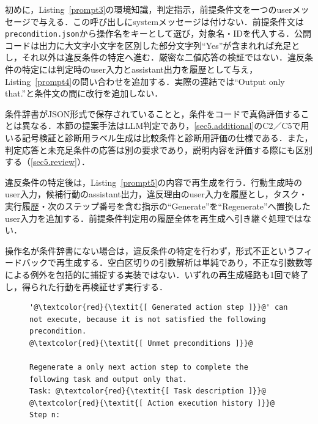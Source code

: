 初めに，Listing~\ref{prompt3}の環境知識，判定指示，前提条件文を一つのuserメッセージで与える．この呼び出しにsystemメッセージは付けない．前提条件文は\texttt{precondition.json}から操作名をキーとして選び，対象名・IDを代入する．公開コードは出力に大文字小文字を区別した部分文字列``Yes''が含まれれば充足とし，それ以外は違反条件の特定へ進む．厳密な二値応答の検証ではない．違反条件の特定には判定時のuser入力とassistant出力を履歴として与え，Listing~\ref{prompt4}の問い合わせを追加する．実際の連結では``Output only that.''と条件文の間に改行を追加しない．

条件辞書がJSON形式で保存されていることと，条件をコードで真偽評価することは異なる．本節の提案手法はLLM判定であり，\ref{sec5.additional}のC2／C5で用いる記号検証と診断用ラベル生成は比較条件と診断用評価の仕様である．また，判定応答と未充足条件の応答は別の要求であり，説明内容を評価する際にも区別する（\ref{sec5.review}）．

違反条件の特定後は，Listing~\ref{prompt5}の内容で再生成を行う．行動生成時のuser入力，候補行動のassistant出力，違反理由のuser入力を履歴とし，タスク・実行履歴・次のステップ番号を含む指示の``Generate''を``Regenerate''へ置換したuser入力を追加する．前提条件判定用の履歴全体を再生成へ引き継ぐ処理ではない．

操作名が条件辞書にない場合は，違反条件の特定を行わず，形式不正というフィードバックで再生成する．空白区切りの引数解析は単純であり，不正な引数数等による例外を包括的に捕捉する実装ではない．いずれの再生成経路も1回で終了し，得られた行動を再検証せず実行する．

%


\begin{figure}[tb]
    \begin{lstlisting}[caption=\ref{Precheck}の「アクションステップ再生成」における「プロンプトD」の生成に用いるプロンプトテンプレート, label=prompt5]
'@\textcolor{red}{\textit{[ Generated action step ]}}@' can not execute, because it is not satisfied the following precondition.
@\textcolor{red}{\textit{[ Unmet preconditions ]}}@

Regenerate a only next action step to complete the following task and output only that.
Task: @\textcolor{red}{\textit{[ Task description ]}}@
@\textcolor{red}{\textit{[ Action execution history ]}}@
Step n: 
    \end{lstlisting}
\end{figure}


